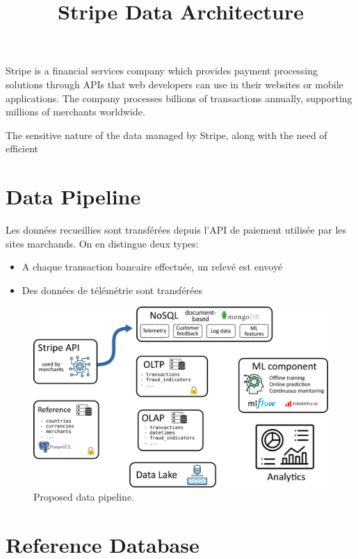 \documentclass[11pt,a4paper,computermodern]{article}
\title{Stripe Data Architecture}
\date{}
\begin{document}
\maketitle

\vspace{-10mm}

Stripe is a financial services company which provides payment processing solutions through APIs that web developers can use in their websites or mobile applications. The company processes billions of transactions annually, supporting millions of merchants worldwide.

The sensitive nature of the data managed by Stripe, along with the need of efficient


\section*{Data Pipeline}

Les données recueillies sont transférées depuis l'API de paiement utilisée par les sites marchands. On en distingue deux types:
\begin{itemize}
	\item A chaque transaction bancaire effectuée, un relevé est envoyé 
	\item Des données de télémétrie sont transférées
\end{itemize}


\begin{figure}[h]
	\centering
	\includegraphics[scale=0.93]{./figures/pipeline}
	\caption{Proposed data pipeline.}
	\label{fig:pipeline}
\end{figure}


\section*{Reference Database}
\end{document}
